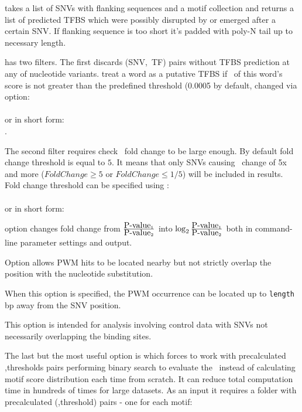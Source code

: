  takes a list of SNVs with flanking sequences and a motif collection and returns a list of predicted TFBS which were possibly disrupted by or emerged after a certain SNV.
If flanking sequence is too short it's padded with poly-N tail up to necessary length.
\usageheader
{}


 has two filters. The first discards (SNV,~TF) pairs without TFBS prediction at any of nucleotide variants.  treat a word as a putative TFBS if \pvalue\ of this word's score is not greater than the predefined threshold (0.0005 by default, changed via  option:\\
\\
or in short form:\\
.

The second filter requires check \pvalue\ fold change to be large enough. By default fold change threshold is equal to $5$. It means that only SNVs causing \pvalue\ change of 5x and more ($FoldChange \ge 5$ or $FoldChange \le 1/5$) will be included in results. Fold change threshold can be specified using :\\
\\
or in short form:\\

 option changes fold change from $\frac{\mbox{P-value}{}_1}{\mbox{P-value}{}_2}$ into
$\log_{2}{\frac{\mbox{P-value}{}_1}{\mbox{P-value}{}_2}}$ both in command-line parameter settings and output.

Option  allows PWM hits to be located nearby but not strictly overlap the position with the nucleotide substitution.

When this option is specified, the PWM occurrence can be located up to \texttt{length} bp away from the SNV position.

This option is intended for analysis involving control data with SNVs not necessarily overlapping the binding sites.


The last but the most useful option is  which forces  to work with precalculated \pvalue,thresholds pairs performing binary search to evaluate the \pvalue\ instead of calculating motif score distribution each time from scratch. It can reduce total computation time in hundreds of times for large datasets.
As an input it requires a folder with precalculated (\pvalue,threshold) pairs - one for each motif:\\

